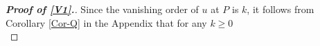 \documentclass[11pt,reqno]{article}
\numberwithin{equation}{section}
\newcommand{\Ma}{\color{blue}}
\newcommand{\Ying}{\color{red}}
\begin{document}
\begin{proof}[\bf Proof of \eqref{V1}.]

            Since the vanishing order of $u$ at $P$ is $k$, it follows from Corollary \ref{Cor-Q} in the Appendix that for any $k\ge 0$
             \begin{equation}\label{eq1704-1}

\end{equation}
\end{proof}
\end{document}
